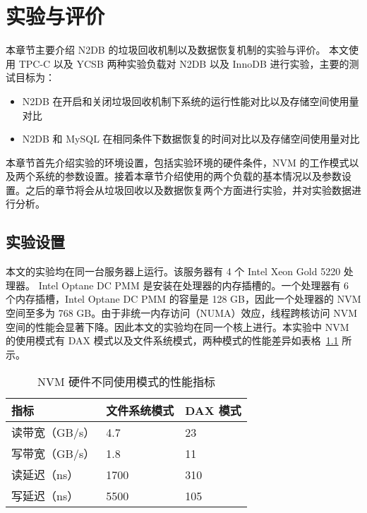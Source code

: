 
\chapter{实验与评价}

本章节主要介绍 N2DB 的垃圾回收机制以及数据恢复机制的实验与评价。
本文使用 TPC-C 以及 YCSB 两种实验负载对 N2DB 以及 InnoDB 进行实验，主要的测试目标为：
\begin{itemize}
    \item N2DB 在开启和关闭垃圾回收机制下系统的运行性能对比以及存储空间使用量对比
    \item N2DB 和 MySQL 在相同条件下数据恢复的时间对比以及存储空间使用量对比
\end{itemize}

本章节首先介绍实验的环境设置，包括实验环境的硬件条件，NVM 的工作模式以及两个系统的参数设置。接着本章节介绍使用的两个负载的基本情况以及参数设置。之后的章节将会从垃圾回收以及数据恢复两个方面进行实验，并对实验数据进行分析。

\section{实验设置}

本文的实验均在同一台服务器上运行。该服务器有 4 个 Intel Xeon Gold 5220 处理器。
Intel Optane DC PMM 是安装在处理器的内存插槽的。一个处理器有 6 个内存插槽，Intel Optane DC PMM 的容量是 128 GB，因此一个处理器的 NVM 空间至多为 768 GB。由于非统一内存访问（NUMA）效应，线程跨核访问 NVM 空间的性能会显著下降。因此本文的实验均在同一个核上进行。本实验中 NVM 的使用模式有 DAX 模式以及文件系统模式，两种模式的性能差异如表格~\ref{tab:nvm-metric} 所示。

\begin{table}
    \centering
    \caption{NVM 硬件不同使用模式的性能指标}
    \begin{tabular}{lll}
        \toprule
        指标           & 文件系统模式 & DAX 模式 \\
        \midrule
        读带宽（GB/s） & 4.7          & 23       \\
        写带宽（GB/s） & 1.8          & 11       \\
        读延迟（ns）   & 1700         & 310      \\
        写延迟（ns）   & 5500         & 105      \\
        \bottomrule
    \end{tabular}
    \label{tab:nvm-metric}
\end{table}

